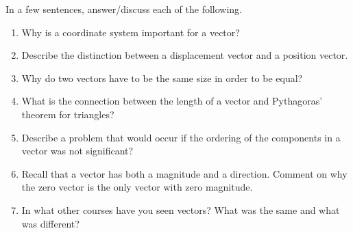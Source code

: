 \begin{exercise}  
In a few sentences, answer\slash discuss each of the following.
\begin{enumerate}
\item Why is a coordinate system important for a vector?

\item Describe the distinction between a displacement vector and a position vector.

\item Why do two vectors have to be the same size in order to be equal?

\item What is the connection between the length of a vector and Pythagoras' theorem for triangles?

\item Describe a problem that would occur if the ordering of the components in a vector was not significant?

\item Recall that a vector has both a magnitude and a direction.  
Comment on why the zero vector is the only vector with zero magnitude.

\item In what other courses have you seen vectors?  What was the same and what was different?

\end{enumerate}
\end{exercise}

